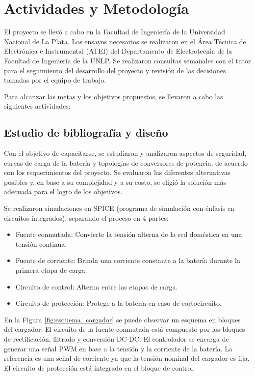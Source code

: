 \section{Actividades y Metodología}


El proyecto se llevó a cabo en la Facultad de Ingeniería de la Universidad Nacional de La Plata.
Los ensayos necesarios se realizaron en el Área Técnica de Electrónica e Instrumental (ATEI)
del Departamento de Electrotecnia de la Facultad de Ingeniería de la UNLP.
Se realizaron consultas semanales con el tutor para el seguimiento del desarrollo del proyecto y
revisión de las decisiones tomadas por el equipo de trabajo.

Para alcanzar las metas y los objetivos propuestos, se llevaron a cabo las siguientes actividades:

\subsection{Estudio de bibliografía y diseño} \label{subsection:estudio_bibliografia}
Con el objetivo de capacitarse, se estudiaron y analizaron aspectos de seguridad, curvas de carga de la batería 
y topologías de conversores de potencia, de acuerdo con los requerimientos del proyecto. 
Se evaluaron las diferentes alternativas posibles y, en base a su complejidad y a su costo,
se eligió la solución más adecuada para el logro de los objetivos. 

Se realizaron simulaciones en SPICE (programa de simulación con énfasis en circuitos integrados),
separando el proceso en 4 partes:
\begin{itemize}
    \item Fuente conmutada: Convierte la tensión alterna de la red doméstica en una tensión continua.
    \item Fuente de corriente: Brinda una corriente constante a la batería durante la primera etapa de carga.
    \item Circuito de control: Alterna entre las etapas de carga.
    \item Circuito de protección: Protege a la batería en caso de cortocircuito.
\end{itemize}

En la Figura \ref{fig:esquema_cargador} se puede observar un esquema en bloques del cargador.
El circuito de la fuente conmutada está compuesto por los bloques de rectificación, filtrado y conversión DC-DC.
El controlador se encarga de generar una señal PWM en base a la tensión y la corriente de la batería.
La referencia es una señal de corriente ya que la tensión nominal del cargador es fija.
El circuito de protección está integrado en el bloque de control.

